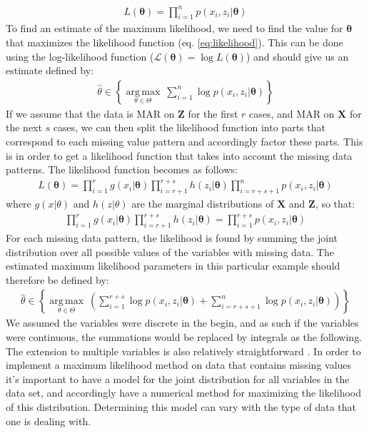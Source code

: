 \documentclass[../thesis.tex]{subfiles}
\begin{document}
\begin{align}
    L(\boldsymbol{\theta}) = \prod_{i=1}^n p(x_i, z_i | \boldsymbol{\theta})
    \label{eq:likelihood}
\end{align}
\noindent To find an estimate of the maximum likelihood, we need to find the value for $\boldsymbol{\theta}$ that maximizes the likelihood function (eq. \ref{eq:likelihood}). This can be done using the log-likelihood function ($\mathcal{L} (\boldsymbol{\theta}) = \log L(\boldsymbol{\theta})$) and should give us an estimate defined by:
\begin{align}
    {\displaystyle {\hat {\theta }}\in \left \{{\underset {\theta \in \Theta }{\operatorname {arg\,max} }}\ \sum_{i=1}^n\log p (x_i, z_i | \boldsymbol{\theta})\right \}}
\end{align}
\noindent If we assume that the data is MAR on $\boldsymbol{Z}$ for the first $r$ cases, and MAR on $\boldsymbol{X}$ for the next $s$ cases, we can then split the likelihood function into parts that correspond to each missing value pattern and accordingly factor these parts. This is in order to get a likelihood function that takes into account the missing data patterns. The likelihood function becomes as follows:
\begin{align}
    L(\boldsymbol{\theta}) = \prod_{i=1}^r g(x_i | \boldsymbol{\theta})\prod_{i=r+1}^{r+s} h(z_i | \boldsymbol{\theta})\prod_{i=r+s+1}^n p(x_i, z_i | \boldsymbol{\theta}) 
\end{align}
\noindent where $g(x | \theta)$ and $h(z | \theta)$ are the marginal distributions of $\boldsymbol{X}$ and $\boldsymbol{Z}$, so that:
\begin{align}
    \prod_{i = 1}^r g(x_i | \boldsymbol{\theta}) \prod_{i = r + 1}^{r + s} h(z_i | \boldsymbol{\theta}) = \prod_{i=1}^{r+s} p(x_i, z_i | \boldsymbol{\theta})
\end{align}
\noindent For each missing data pattern, the likelihood is found by summing the joint distribution over all possible values of the variables with missing data. The estimated maximum likelihood parameters in this particular example should therefore be defined by:
\begin{align}
    {\displaystyle {\hat {\theta }}\in \left \{{\underset {\theta \in \Theta }{\operatorname {arg\,max} }}\ \left(\sum_{i=1}^{r+s}\log p(x_i, z_i | \boldsymbol{\theta}) + \sum_{i=r+s+1}^n\log p (x_i, z_i | \boldsymbol{\theta})\right)  \right\}}
\end{align}
\noindent We assumed the variables were discrete in the begin, and as such if the variables were continuous, the summations would be replaced by integrals as the following. The extension to multiple variables is also relatively straightforward \citep{allison1999missing}. In order to implement a maximum likelihood method on data that contains missing values it's important to have a model for the joint distribution for all variables in the data set, and accordingly have a numerical method for maximizing the likelihood of this distribution. Determining this model can vary with the type of data that one is dealing with.\\
\end{document}

